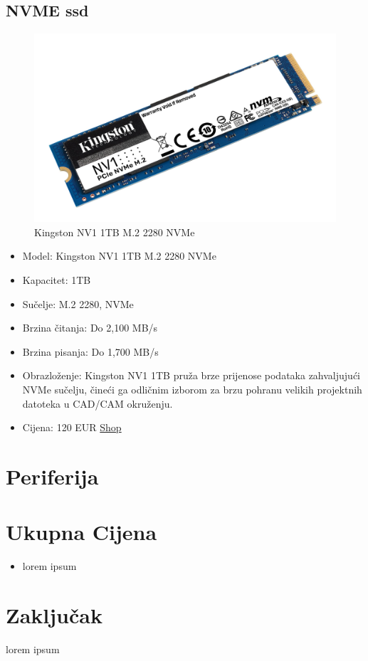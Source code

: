 \documentclass{article}
\begin{document}
\subsection{NVME ssd}
\begin{figure}[H]
    \centering
    \includegraphics[scale=0.1]{Slike/NVMe.jpg}
    \caption{Kingston NV1 1TB M.2 2280 NVMe}
    \label{fig:NVMe}
\end{figure}
\begin{itemize}
    \item Model: Kingston NV1 1TB M.2 2280 NVMe
    \item Kapacitet: 1TB
    \item Sučelje: M.2 2280, NVMe
    \item Brzina čitanja: Do 2,100 MB/s
    \item Brzina pisanja: Do 1,700 MB/s
    \item Obrazloženje: Kingston NV1 1TB pruža brze prijenose podataka zahvaljujući NVMe sučelju, čineći ga odličnim izborom za brzu pohranu velikih projektnih datoteka u CAD/CAM okruženju.
    \item Cijena: 120 EUR \href{https://vacom.hr/proizvod/ssd-kingston-nv1-1tb-m-2-2280-nvme/}{Shop}
\end{itemize}

\section{Periferija}


\section{Ukupna Cijena}
\begin{itemize}
    \item lorem ipsum
\end{itemize}

\section{Zaključak}
lorem ipsum     
\end{document}
